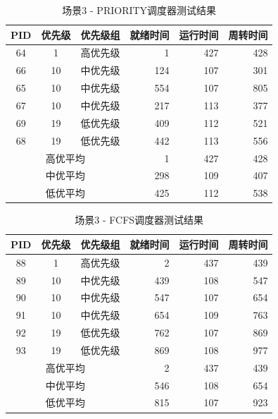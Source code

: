 \documentclass[a4paper, 12pt]{article}
\begin{document}
\begin{table}[H]
	\centering
	\caption{场景3 - PRIORITY调度器测试结果}
	\begin{tabular}{cccrrr}
		\toprule
		\textbf{PID} & \textbf{优先级} & \textbf{优先级组} & \textbf{就绪时间} & \textbf{运行时间} & \textbf{周转时间} \\
		\midrule
		64 & 1 & 高优先级 & 1 & 427 & 428 \\
		66 & 10 & 中优先级 & 124 & 107 & 301 \\
		65 & 10 & 中优先级 & 554 & 107 & 805 \\
		67 & 10 & 中优先级 & 217 & 113 & 377 \\
		69 & 19 & 低优先级 & 409 & 112 & 521 \\
		68 & 19 & 低优先级 & 442 & 113 & 556 \\
		\midrule
		\multicolumn{3}{c}{高优平均} & 1 & 427 & 428 \\
		\multicolumn{3}{c}{中优平均} & 298 & 109 & 407 \\
		\multicolumn{3}{c}{低优平均} & 425 & 112 & 538 \\
		\bottomrule
	\end{tabular}
\end{table}

\begin{table}[H]
	\centering
	\caption{场景3 - FCFS调度器测试结果}
	\begin{tabular}{cccrrr}
		\toprule
		\textbf{PID} & \textbf{优先级} & \textbf{优先级组} & \textbf{就绪时间} & \textbf{运行时间} & \textbf{周转时间} \\
		\midrule
		88 & 1 & 高优先级 & 2 & 437 & 439 \\
		89 & 10 & 中优先级 & 439 & 108 & 547 \\
		90 & 10 & 中优先级 & 547 & 107 & 654 \\
		91 & 10 & 中优先级 & 654 & 109 & 763 \\
		92 & 19 & 低优先级 & 762 & 107 & 869 \\
		93 & 19 & 低优先级 & 869 & 108 & 977 \\
		\midrule
		\multicolumn{3}{c}{高优平均} & 2 & 437 & 439 \\
		\multicolumn{3}{c}{中优平均} & 546 & 108 & 654 \\
		\multicolumn{3}{c}{低优平均} & 815 & 107 & 923 \\
		\bottomrule
	\end{tabular}
\end{table}
\end{document}
